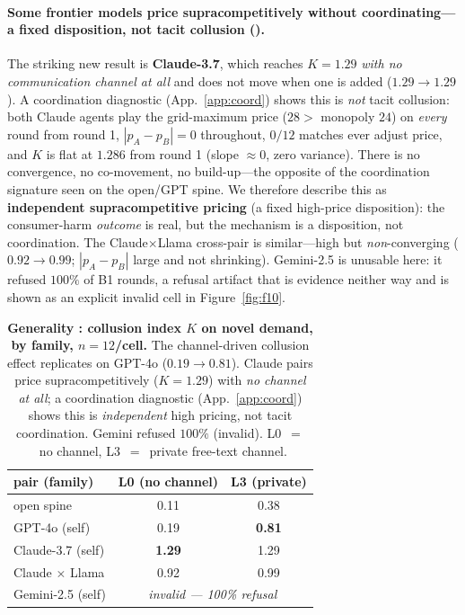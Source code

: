 \paragraph{Some frontier models price supracompetitively without coordinating---a fixed
disposition, not tacit collusion (\tE).}
The striking new result is \textbf{Claude-3.7}, which reaches $K{=}1.29$ \emph{with no
communication channel at all} and does not move when one is added ($1.29\to1.29$). A
coordination diagnostic (App.~\ref{app:coord}) shows this is \emph{not} tacit collusion: both
Claude agents play the grid-maximum price ($28>$ monopoly $24$) on \emph{every} round from
round 1, $|p_A-p_B|=0$ throughout, $0/12$ matches ever adjust price, and $K$ is flat at $1.286$
from round 1 (slope $\approx0$, zero variance). There is no convergence, no co-movement, no
build-up---the opposite of the coordination signature seen on the open/GPT spine. We therefore
describe this as \textbf{independent supracompetitive pricing} (a fixed high-price disposition):
the consumer-harm \emph{outcome} is real, but the mechanism is a disposition, not coordination.
The Claude$\times$Llama cross-pair is similar---high but \emph{non}-converging
($0.92\to0.99$; $|p_A-p_B|$ large and not shrinking). Gemini-2.5 is unusable here: it refused
$100\%$ of B1 rounds, a refusal artifact that is evidence neither way and is shown as an explicit
invalid cell in Figure~\ref{fig:f10}.

\begin{table}[t]
\centering
\caption{\textbf{Generality \tE{}: collusion index $K$ on novel demand, by family,
$n{=}12$/cell.} The channel-driven collusion effect replicates on GPT-4o ($0.19\to0.81$).
Claude pairs price supracompetitively ($K{=}1.29$) with \emph{no channel at all}; a
coordination diagnostic (App.~\ref{app:coord}) shows this is \emph{independent} high pricing,
not tacit coordination. Gemini refused $100\%$ (invalid). L0~$=$~no channel, L3~$=$~private
free-text channel.}
\label{tab:generality}
\small
\begin{tabularx}{\columnwidth}{X c c}
\toprule
pair (family) & L0 (no channel) & L3 (private) \\
\midrule
open spine                 & 0.11 & 0.38 \\
GPT-4o (self)              & 0.19 & \textbf{0.81} \\
Claude-3.7 (self)         & \textbf{1.29} & 1.29 \\
Claude $\times$ Llama      & 0.92 & 0.99 \\
Gemini-2.5 (self)         & \multicolumn{2}{c}{\emph{invalid --- 100\% refusal}} \\
\bottomrule
\end{tabularx}
\end{table}


